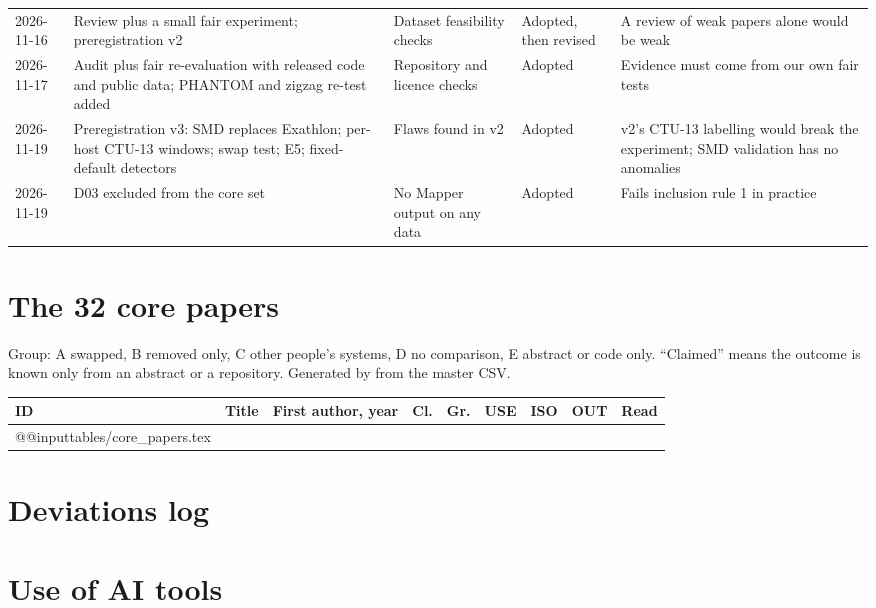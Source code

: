 {\begin{longtable}{@{}L{1.9cm}L{4.1cm}L{3.5cm}L{1.6cm}L{3.6cm}@{}}
2026-11-16 & Review plus a small fair experiment; preregistration v2 & Dataset feasibility checks & Adopted, then revised & A review of weak papers alone would be weak \\
2026-11-17 & Audit plus fair re-evaluation with released code and public data; PHANTOM and zigzag re-test added & Repository and licence checks & Adopted & Evidence must come from our own fair tests \\
2026-11-19 & Preregistration v3: SMD replaces Exathlon; per-host CTU-13 windows; swap test; E5; fixed-default detectors & Flaws found in v2 & Adopted & v2's CTU-13 labelling would break the experiment; SMD validation has no anomalies \\
2026-11-19 & D03 excluded from the core set & No Mapper output on any data & Adopted & Fails inclusion rule 1 in practice \\
\bottomrule
\end{longtable}
}

\section{The 32 core papers}
\label{app:papers}
Group: A swapped, B removed only, C other people's systems, D no comparison, E abstract or code only. ``Claimed'' means the outcome is known only from an abstract or a repository. Generated by  from the master CSV.

{\footnotesize\setlength{\tabcolsep}{4pt}
\begin{longtable}{@{}lL{3.8cm}L{2.9cm}llL{1.75cm}L{1.8cm}ll@{}}
\toprule
ID & Title & First author, year & Cl. & Gr. & USE & ISO & OUT & Read \\
\midrule
\endhead
\csname @@input\endcsname tables/core_papers.tex %
\bottomrule
\end{longtable}
}

\section{Deviations log}
\label{app:deviations}

\section{Use of AI tools}
\label{app:ai}
